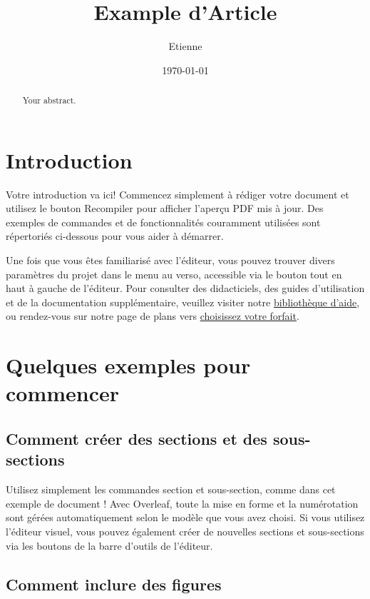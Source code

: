 \documentclass{article}
\title{Example d'Article}
\author{Etienne}
\date{\today}
\begin{document}
\maketitle

\begin{abstract}
Your abstract.
\end{abstract}

\section{Introduction}

Votre introduction va ici! Commencez simplement à rédiger votre document et utilisez le bouton Recompiler pour afficher l'aperçu PDF mis à jour. Des exemples de commandes et de fonctionnalités couramment utilisées sont répertoriés ci-dessous pour vous aider à démarrer.

Une fois que vous êtes familiarisé avec l'éditeur, vous pouvez trouver divers paramètres du projet dans le menu au verso, accessible via le bouton tout en haut à gauche de l'éditeur. Pour consulter des didacticiels, des guides d'utilisation et de la documentation supplémentaire, veuillez visiter notre \href{https://www.overleaf.com/learn}{bibliothèque d'aide}, ou rendez-vous sur notre page de plans vers \href{https://www. overleaf.com/user/subscription/plans}{choisissez votre forfait}.

\section{Quelques exemples pour commencer}

\subsection{Comment créer des sections et des sous-sections}

Utilisez simplement les commandes section et sous-section, comme dans cet exemple de document ! Avec Overleaf, toute la mise en forme et la numérotation sont gérées automatiquement selon le modèle que vous avez choisi. Si vous utilisez l'éditeur visuel, vous pouvez également créer de nouvelles sections et sous-sections via les boutons de la barre d'outils de l'éditeur.

\subsection{Comment inclure des figures}
\end{document}
